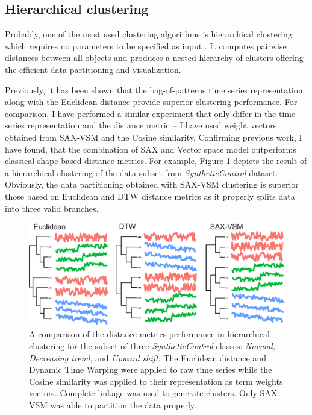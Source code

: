 \subsection{Hierarchical clustering}
Probably, one of the most used clustering algorithms is hierarchical clustering which requires no
parameters to be specified as input \cite{citeulike:1576606}. It computes pairwise distances between all objects 
and produces a nested hierarchy of clusters offering the efficient data partitioning and visualization. 

Previously, it has been shown that the bag-of-patterns time series representation along with the Euclidean distance
provide superior clustering performance\cite{citeulike:10525778}. 
For comparison, I have performed a similar experiment that only differ in the time series representation and
the distance metric -- I have used \tfidf weight vectors obtained from SAX-VSM and the Cosine similarity. 
Confirming previous work, I have found, that the combination of SAX and Vector space model outperforms 
classical shape-based distance metrics. 
For example, Figure \ref{fig:hc} depicts the result of a hierarchical clustering of the data subset from 
\textit{SyntheticControl} dataset. 
Obviously, the data partitioning obtained with SAX-VSM clustering is superior those based on Euclidean and DTW 
distance metrics as it properly splits data into three valid branches.

\begin{figure}[!h!t]
   \centering
   \includegraphics[width=120mm]{figures/clustering.eps}
   \caption[A comparison of the distance metrics performance in hierarchical clustering for the subset of three
   \textit{SyntheticControl} classes: \textit{Normal, Decreasing trend}, and \textit{Upward shift}.]
   {A comparison of the distance metrics performance in hierarchical clustering for the subset of three
   \textit{SyntheticControl} classes: \textit{Normal, Decreasing trend}, and \textit{Upward shift}. 
   The Euclidean distance and Dynamic Time Warping were applied to raw time series while the Cosine similarity 
   was applied to their representation as term weights vectors. Complete linkage was used to generate clusters. 
   Only SAX-VSM was able to partition the data properly.   }
   \label{fig:hc}
\end{figure}

